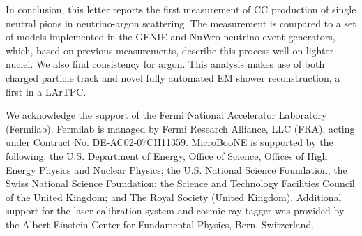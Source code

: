 \documentclass[%
 reprint,
superscriptaddress,
amsmath,amssymb,
prl,
floatfix,
]{revtex4-1}
\begin{document}
In conclusion, this letter reports the first measurement of CC production of single neutral pions in neutrino-argon scattering. The measurement is compared to a set of models implemented in the GENIE and {\sc NuWro} neutrino event generators, which, based on previous measurements, describe this process well on lighter nuclei. We also find consistency for argon. This analysis makes use of both charged particle track and novel fully automated EM shower reconstruction, a first in a LArTPC.  

We acknowledge the support of the Fermi National Accelerator Laboratory (Fermilab). Fermilab is managed by Fermi Research Alliance, LLC (FRA), acting under Contract No. DE-AC02-07CH11359.  MicroBooNE is supported by the following: the U.S. Department of Energy, Office of Science, Offices of High Energy Physics and Nuclear Physics; the U.S. National Science Foundation; the Swiss National Science Foundation; the Science and Technology Facilities Council of the United Kingdom; and The Royal Society (United Kingdom).  Additional support for the laser calibration system and cosmic ray tagger was provided by the Albert Einstein Center for Fundamental Physics, Bern, Switzerland.




\end{document}
